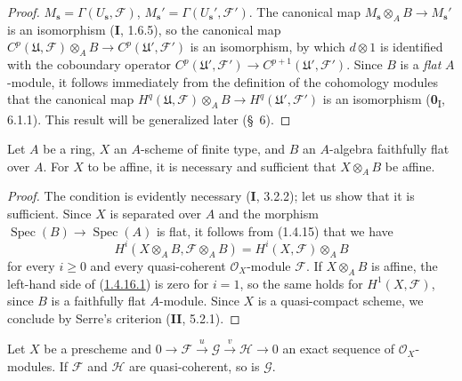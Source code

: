 \begin{proof}
$M_{\mathbf s}=\Gamma(U_{\mathbf s},\mathcal F)$,\quad
$M_{\mathbf s}'=\Gamma(U_{\mathbf s}',\mathcal F')$.
The canonical map
$M_{\mathbf s}\otimes_A B\to M_{\mathbf s}'$ is an isomorphism
(\textbf{I}, 1.6.5), so the canonical map
$C^p(\mathfrak U,\mathcal F)\otimes_A B\to
C^p(\mathfrak U',\mathcal F')$ is an isomorphism, by which
$d\otimes1$ is identified with the coboundary operator
$C^p(\mathfrak U',\mathcal F')\to C^{p+1}(\mathfrak U',\mathcal F')$.
Since $B$ is a \emph{flat} $A$-module, it follows immediately from the
definition of the cohomology modules that the canonical map
$H^q(\mathfrak U,\mathcal F)\otimes_A B\to
H^q(\mathfrak U',\mathcal F')$ is an isomorphism
(\textbf{0}\textsubscript{I}, 6.1.1). This result will be generalized later (\S~6).
\end{proof}

\begin{corollary}[1.4.16]
\label{III.1.4.16}
Let $A$ be a ring, $X$ an $A$-scheme of finite type, and $B$ an $A$-algebra
faithfully flat over $A$. For $X$ to be affine, it is necessary and sufficient
that $X\otimes_A B$ be affine.
\end{corollary}

\begin{proof}
The condition is evidently necessary (\textbf{I}, 3.2.2); let us show that it is
sufficient. Since $X$ is separated over $A$ and the morphism
$\operatorname{Spec}(B)\to\operatorname{Spec}(A)$ is flat, it follows from
(1.4.15) that we have
\begin{equation}
\label{III.1.4.16.1}
\tag{1.4.16.1}
H^i(X\otimes_A B,\mathcal F\otimes_A B)
=H^i(X,\mathcal F)\otimes_A B
\end{equation}
for every $i\geq0$ and every quasi-coherent $\mathcal O_X$-module $\mathcal F$.
If $X\otimes_A B$ is affine, the left-hand side of
(\hyperref[III.1.4.16.1]{1.4.16.1}) is zero for $i=1$, so the same holds
for $H^1(X,\mathcal F)$, since $B$ is a faithfully flat $A$-module.
Since $X$ is a quasi-compact scheme, we conclude by Serre's criterion
(\textbf{II}, 5.2.1).
\end{proof}

\begin{proposition}[1.4.17]
\label{III.1.4.17}
Let $X$ be a prescheme and
$0\to\mathcal F\xrightarrow{u}\mathcal G\xrightarrow{v}\mathcal H\to0$
an exact sequence of $\mathcal O_X$-modules. If $\mathcal F$ and $\mathcal H$
are quasi-coherent, so is $\mathcal G$.
\end{proposition}

